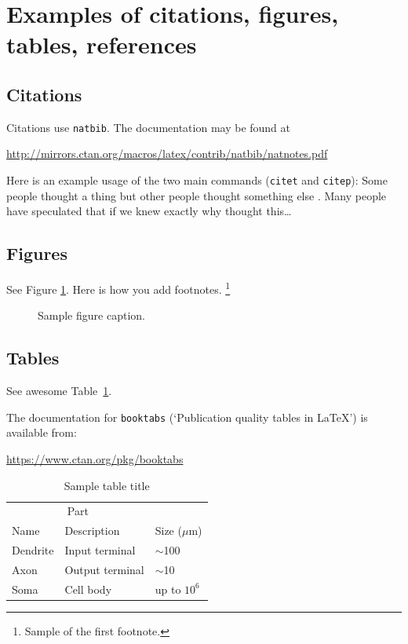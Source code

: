\documentclass{article}
\begin{document}
\section{Examples of citations, figures, tables, references}
\label{sec:others}

\subsection{Citations}
Citations use \verb+natbib+. The documentation may be found at
\begin{center}
	\url{http://mirrors.ctan.org/macros/latex/contrib/natbib/natnotes.pdf}
\end{center}

Here is an example usage of the two main commands (\verb+citet+ and \verb+citep+): Some people thought a thing \citep{kour2014real, hadash2018estimate} but other people thought something else \citep{kour2014fast}. Many people have speculated that if we knew exactly why \citet{kour2014fast} thought this\dots

\subsection{Figures}
\lipsum[10]
See Figure \ref{fig:fig1}. Here is how you add footnotes. \footnote{Sample of the first footnote.}
\lipsum[11]

\begin{figure}
	\centering
	\fbox{\rule[-.5cm]{4cm}{4cm} \rule[-.5cm]{4cm}{0cm}}
	\caption{Sample figure caption.}
	\label{fig:fig1}
\end{figure}

\subsection{Tables}
See awesome Table~\ref{tab:table}.

The documentation for \verb+booktabs+ (`Publication quality tables in LaTeX') is available from:
\begin{center}
	\url{https://www.ctan.org/pkg/booktabs}
\end{center}


\begin{table}
	\caption{Sample table title}
	\centering
	\begin{tabular}{lll}
		\toprule
		\multicolumn{2}{c}{Part}                   \\
		\cmidrule(r){1-2}
		Name     & Description     & Size ($\mu$m) \\
		\midrule
		Dendrite & Input terminal  & $\sim$100     \\
		Axon     & Output terminal & $\sim$10      \\
		Soma     & Cell body       & up to $10^6$  \\
		\bottomrule
	\end{tabular}
	\label{tab:table}
\end{table}
\end{document}

